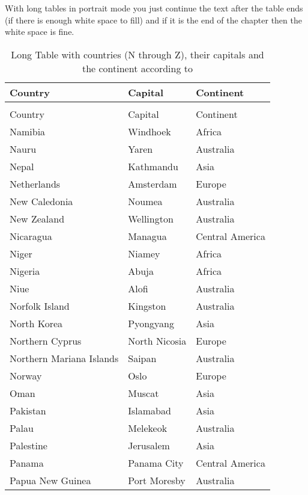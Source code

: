 With long tables in portrait mode you just continue the text after the table ends (if there is enough white space to fill) and if it is the end of the chapter then the white space is fine.

\lipsum[3]

\begin{longtable}{>{\raggedright}p{}>{\centering}p{}p{}}
\endfirsthead 
\hline
Country & Capital & Continent\\\hline
\endhead
\caption{Long Table with countries (N through Z), their capitals and the continent according to \cite{cite-techslides_2013} \label{tab:longCountry2}} \\
\hline
Country         & Capital           & Continent \\ \hline
Namibia         & Windhoek          & Africa\\
Nauru           & Yaren             & Australia\\
Nepal           & Kathmandu         & Asia\\
Netherlands     & Amsterdam         & Europe\\
New Caledonia   & Noumea            & Australia\\
New Zealand     & Wellington        & Australia\\
Nicaragua       & Managua           & Central America\\
Niger           & Niamey            & Africa\\
Nigeria         & Abuja             & Africa\\
Niue            & Alofi             & Australia\\
Norfolk Island  & Kingston          & Australia\\
North Korea     & Pyongyang         & Asia\\
Northern Cyprus & North Nicosia     & Europe\\
Northern Mariana Islands & Saipan   & Australia\\
Norway          & Oslo              & Europe\\
Oman            & Muscat            & Asia\\
Pakistan        & Islamabad         & Asia\\
Palau           & Melekeok          & Australia\\
Palestine       & Jerusalem         & Asia\\
Panama          & Panama City       & Central America\\
Papua New Guinea & Port Moresby     & Australia\\

\end{longtable}
